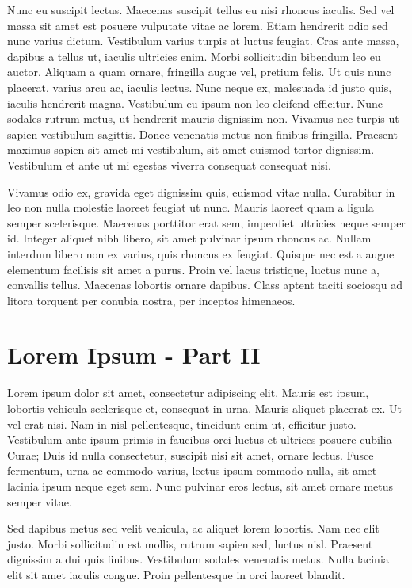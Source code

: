 \documentclass[
	12pt,				%
    oneside,			%
	a4paper,			%
	english,			%
	french,				%
	spanish,			%
	brazil				%
	]{abntex2}
\begin{document}
Nunc eu suscipit lectus. Maecenas suscipit tellus eu nisi rhoncus iaculis. Sed vel massa sit amet est posuere vulputate vitae ac lorem. Etiam hendrerit odio sed nunc varius dictum. Vestibulum varius turpis at luctus feugiat. Cras ante massa, dapibus a tellus ut, iaculis ultricies enim. Morbi sollicitudin bibendum leo eu auctor. Aliquam a quam ornare, fringilla augue vel, pretium felis. Ut quis nunc placerat, varius arcu ac, iaculis lectus. Nunc neque ex, malesuada id justo quis, iaculis hendrerit magna. Vestibulum eu ipsum non leo eleifend efficitur. Nunc sodales rutrum metus, ut hendrerit mauris dignissim non. Vivamus nec turpis ut sapien vestibulum sagittis. Donec venenatis metus non finibus fringilla. Praesent maximus sapien sit amet mi vestibulum, sit amet euismod tortor dignissim. Vestibulum et ante ut mi egestas viverra consequat consequat nisi.

Vivamus odio ex, gravida eget dignissim quis, euismod vitae nulla. Curabitur in leo non nulla molestie laoreet feugiat ut nunc. Mauris laoreet quam a ligula semper scelerisque. Maecenas porttitor erat sem, imperdiet ultricies neque semper id. Integer aliquet nibh libero, sit amet pulvinar ipsum rhoncus ac. Nullam interdum libero non ex varius, quis rhoncus ex feugiat. Quisque nec est a augue elementum facilisis sit amet a purus. Proin vel lacus tristique, luctus nunc a, convallis tellus. Maecenas lobortis ornare dapibus. Class aptent taciti sociosqu ad litora torquent per conubia nostra, per inceptos himenaeos.


\section{Lorem Ipsum - Part II}

Lorem ipsum dolor sit amet, consectetur adipiscing elit. Mauris est ipsum, lobortis vehicula scelerisque et, consequat in urna. Mauris aliquet placerat ex. Ut vel erat nisi. Nam in nisl pellentesque, tincidunt enim ut, efficitur justo. Vestibulum ante ipsum primis in faucibus orci luctus et ultrices posuere cubilia Curae; Duis id nulla consectetur, suscipit nisi sit amet, ornare lectus. Fusce fermentum, urna ac commodo varius, lectus ipsum commodo nulla, sit amet lacinia ipsum neque eget sem. Nunc pulvinar eros lectus, sit amet ornare metus semper vitae.

Sed dapibus metus sed velit vehicula, ac aliquet lorem lobortis. Nam nec elit justo. Morbi sollicitudin est mollis, rutrum sapien sed, luctus nisl. Praesent dignissim a dui quis finibus. Vestibulum sodales venenatis metus. Nulla lacinia elit sit amet iaculis congue. Proin pellentesque in orci laoreet blandit.
\end{document}
